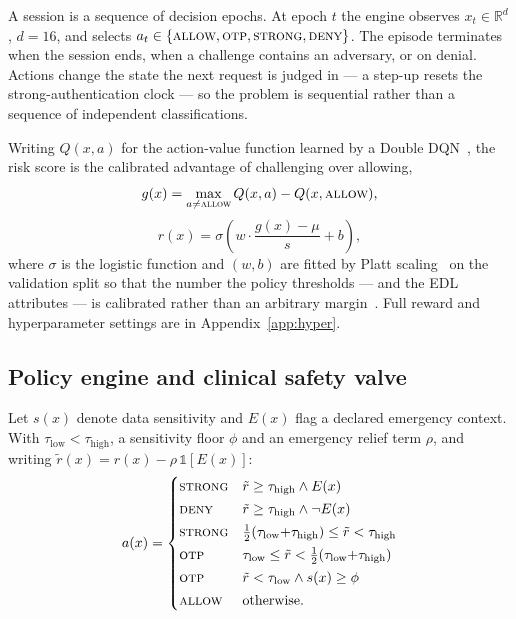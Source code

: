 \documentclass[conference]{IEEEtran}
\newcommand{\allow}{\textsc{allow}}
\newcommand{\otp}{\textsc{otp}}
\newcommand{\strongauth}{\textsc{strong}}
\newcommand{\deny}{\textsc{deny}}
\begin{document}
A session is a sequence of decision epochs. At epoch $t$ the engine observes
$x_t \in \mathbb{R}^{d}$, $d=16$, and selects
$a_t \in \{\allow, \otp, \strongauth, \deny\}$. The episode terminates when the
session ends, when a challenge contains an adversary, or on denial. Actions
change the state the next request is judged in --- a step-up resets the
strong-authentication clock --- so the problem is sequential rather than a
sequence of independent classifications.

Writing $Q(x,a)$ for the action-value function learned by a Double
DQN~\cite{vanhasselt2016,mnih2015}, the risk score is the calibrated advantage
of challenging over allowing,
\begin{equation}
g(x) = \max_{a \neq \allow} Q(x,a) - Q(x,\allow),
\label{eq:adv}
\end{equation}
\begin{equation}
r(x) = \sigma\!\left(w \cdot \frac{g(x)-\mu}{s} + b\right),
\label{eq:platt}
\end{equation}
where $\sigma$ is the logistic function and $(w,b)$ are fitted by Platt
scaling~\cite{platt1999} on the validation split so that the number the policy
thresholds --- and the EDL attributes --- is calibrated rather than an
arbitrary margin~\cite{guo2017}. Full reward and hyperparameter settings are in
Appendix~\ref{app:hyper}.

\subsection{Policy engine and clinical safety valve}

Let $s(x)$ denote data sensitivity and $E(x)$ flag a declared emergency
context. With $\tau_{\text{low}} < \tau_{\text{high}}$, a sensitivity floor
$\phi$ and an emergency relief term $\rho$, and writing
$\tilde r(x)= r(x) - \rho\,\mathbb{1}[E(x)]$:
\begin{equation}
a(x) =
\begin{cases}
\strongauth & \tilde r \geq \tau_{\text{high}} \wedge E(x)\\[2pt]
\deny & \tilde r \geq \tau_{\text{high}} \wedge \neg E(x)\\[2pt]
\strongauth & \tfrac{1}{2}(\tau_{\text{low}}{+}\tau_{\text{high}}) \le \tilde r < \tau_{\text{high}}\\[2pt]
\otp & \tau_{\text{low}} \leq \tilde r < \tfrac{1}{2}(\tau_{\text{low}}{+}\tau_{\text{high}})\\[2pt]
\otp & \tilde r < \tau_{\text{low}} \wedge s(x) \geq \phi\\[2pt]
\allow & \text{otherwise.}
\end{cases}
\label{eq:policy}
\end{equation}
\end{document}
